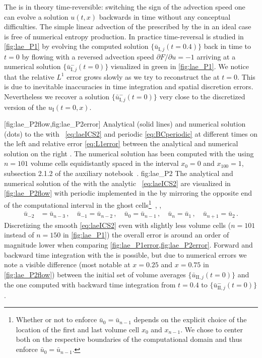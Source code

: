 The \lae{} is in theory time-reversible: switching the sign of the advection speed one can evolve a solution $u(t,x)$ backwards in time without any conceptual difficulties.
The simple linear advection of the \ic{} prescribed by the \lae{} in an ideal case is free of numerical entropy production.
In practice time-reversal is studied in \cref{fig:lae_P1} by evolving the computed solution $\{\bar{u}_{\mathrm{I},j}(t=0.4)\}$ back in time to $t=0$ by flowing with a reversed advection speed $\partial F/\partial u=-1$ arriving at a numerical solution $\{\bar{u}_{\mathrm{I},j}^-(t=0)\}$ visualized in green  in \cref{fig:lae_P1}.
We notice that the relative $L^1$ error grows slowly as we try to reconstruct the \ic{} at $t=0$.
This is due to inevitable inaccuracies in time integration and spatial discretion errors.
Nevertheless we recover a solution $\{\bar{u}_{\mathrm{I},j}^-(t=0)\}$ very close to the discretized version of the \ic{} $u_\mathrm{I}(t=0,x)$.

	[fig:lae_P2flow,fig:lae_P2error]%
	{%
	Analytical (solid lines) and numerical solution (dots) to the \laeq{} with \ic{}~\eqref{eq:laeICS2} and periodic \bc{} \eqref{eq:BCperiodic} at different times on the left  and relative error \eqref{eq:L1error} between the analytical and numerical solution on the right .
	The numerical solution has been computed with the \ktScheme{} using $n=101$ volume cells equidistantly spaced in the interval $x_0=0$ and $x_{100}=1$, \cf{} subsection 2.1.2 of the auxiliary notebook~\cite{Steil:2023PhDFVNB}.
	}%
	{fig:lae_P2}%
The analytical and numerical solution of the \laeq{} with the analytic \ic{}~\eqref{eq:laeICS2} are visualized in \cref{fig:lae_P2flow} with periodic \bcs{} implemented in the \ktScheme{} by mirroring the opposite end of the computational interval in the ghost cells\footnote{%
	Whether or not to enforce $\bar{u}_0=\bar{u}_{n-1}$ depends on the explicit choice of the location of the first and last volume cell $x_0$ and $x_{n-1}$.
	We chose to center both on the respective boundaries of the computational domain and thus enforce $\bar{u}_0=\bar{u}_{n-1}$.
}~\cite{LeVeque:1992,LeVeque:2002,Vazquez-Cendon2015}, \ie{},
\begin{align}
	\bar{u}_{-2}&=\bar{u}_{n-3}\,,\quad \bar{u}_{-1}=\bar{u}_{n-2}\,,\quad \bar{u}_0=\bar{u}_{n-1}\,,\quad
	\bar{u}_{n}=\bar{u}_1\,,\quad \bar{u}_{n+1}=\bar{u}_{2}\,.
	\label{eq:BCperiodic}
\end{align}
Discretizing the smooth \ic{} \eqref{eq:laeICS2} even with slightly less volume cells ($n=101$ instead of $n=150$ in \cref{fig:lae_P1}) the overall error is around an order of magnitude lower when comparing \cref{fig:lae_P1error,fig:lae_P2error}.
Forward and backward time integration with the \ktScheme{} is possible, but due to numerical errors we note a visible difference (most notable at $x=0.25$ and $x=0.75$ in \cref{fig:lae_P2flow}) between the initial set of volume averages $\{\bar{u}_{\mathrm{II},j}(t=0)\}$ and the one computed with backward time integration from $t=0.4$ to $\{\bar{u}_{\mathrm{II},j}^-(t=0)\}$.

